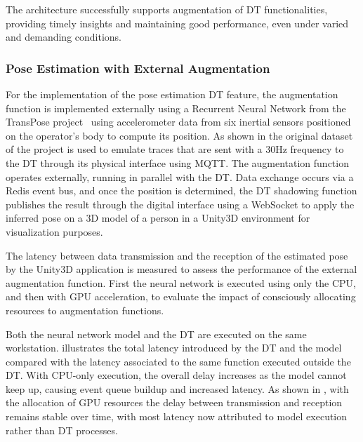 The architecture successfully supports augmentation of DT functionalities, providing timely insights and maintaining good performance, even under varied and demanding conditions.



\subsubsection{Pose Estimation with External Augmentation}

For the implementation of the pose estimation \ac{DT} feature,
the augmentation function is implemented externally using a Recurrent Neural Network from the TransPose project~\cite{TransPoseSIGGRAPH2021} using accelerometer data from six inertial sensors positioned on the operator's body to compute its position.
%
As shown in  the original dataset of the project is used to emulate traces that are sent with a 30Hz frequency to the \ac{DT} through its physical interface using MQTT.
%
The augmentation function operates externally, running in parallel with the DT. Data exchange occurs via a Redis event bus, and once the position is determined, the \ac{DT} shadowing function publishes the result through the digital interface using a WebSocket to apply the inferred pose on a 3D model of a person in a Unity3D environment for visualization purposes.

The latency between data transmission and the reception of the estimated pose by the Unity3D application is measured to assess the performance of the external augmentation function.
%
First the neural network is executed using only the CPU, and then with GPU acceleration, to evaluate the impact of consciously allocating resources to augmentation functions.

Both the neural network model and the DT are executed on the same workstation.  illustrates the total latency introduced by the DT and the model compared with the latency associated to the same function executed outside the DT.
%
With CPU-only execution, the overall delay increases as the model cannot keep up, causing event queue buildup and increased latency. 
As shown in , with the allocation of GPU resources the delay between transmission and reception remains stable over time, with most latency now attributed to model execution rather than DT processes.


